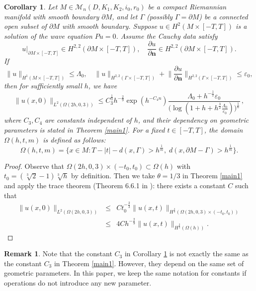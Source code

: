 \documentclass[11pt,letterpaper]{amsart}
\numberwithin{equation}{section}
\theoremstyle{definition}
\theoremstyle{plain}
\theoremstyle{definition}
\theoremstyle{plain}
\newtheorem{initial}[main1]{Corollary}
\theoremstyle{definition}
\newtheorem{remark}[remark0]{Remark}
\theoremstyle{plain}
\begin{document}
\begin{initial}\label{initial}
Let $M\in \mathcal{M}_n(D,K_1,K_2,i_0,r_0)$ be a compact Riemannian manifold with smooth boundary $\partial M$, and let $\Gamma$ (possibly $\Gamma=\partial M$) be a connected open subset of $\partial M$ with smooth boundary. Suppose $u\in H^2(M\times[-T,T])$ is a solution of the wave equation $Pu=0$. Assume the Cauchy data satisfy
$$u|_{\partial M\times [-T,T]}\in H^{2,2}(\partial M \times [-T,T]),\quad \frac{\partial u}{\partial \mathbf{n}} \in H^{2,2}(\partial M \times [-T,T]).$$
If
$$\|u\|_{H^1(M\times[-T,T])}\leqslant \Lambda_0,\quad \|u\|_{H^{2,2}(\Gamma\times [-T,T])}+\big\|\frac{\partial u}{\partial \mathbf{n}}\big\|_{H^{2,2}(\Gamma\times [-T,T])}\leqslant \varepsilon_0,$$
then for sufficiently small $h$, we have
$$\|u(x,0)\|_{L^2(\Omega(2h,0,3))} \leqslant C_3^{\frac{1}{3}}h^{-\frac{2}{9}}\exp(h^{-C_4 n}) \frac{\Lambda_0+h^{-\frac{1}{2}}\varepsilon_0}{\big(\log (1+h+h^{\frac{3}{2}}\frac{\Lambda_0}{\varepsilon_0})\big) ^{\frac{1}{6}}}\, ,$$
where $C_3,C_4$ are constants independent of $h$, and their dependency on geometric parameters is stated in Theorem \ref{main1}. For a fixed $t\in [-T,T]$, the domain $\Omega(h,t,m)$ is defined as follows:
\begin{equation}\label{Omegahtm}
\Omega(h,t,m)=\big\{x\in M: T-|t|-d(x,\Gamma) >h^{\frac{1}{m}},\; d(x,\partial M-\Gamma)>h^{\frac{1}{m}}\big\}.
\end{equation}
\end{initial}
\begin{proof}
Observe that $\Omega(2h,0,3)\times (-t_0,t_0)\subset \Omega(h)$ with $t_0=(\sqrt[3]{2}-1)\sqrt[3]{h}$ by definition. Then we take $\theta=1/3$ in Theorem \ref{main1} and apply the trace theorem (Theorem 6.6.1 in \cite{BL}): there exists a constant $C$ such that
\begin{eqnarray*}
\|u(x,0)\|_{L^2(\Omega(2h,0,3))} &\leqslant& C t_0^{-\frac{2}{3}}\|u(x,t)\|_{H^{\frac{2}{3}}(\Omega(2h,0,3)\times(-t_0,t_0))} \\
&\leqslant& 4C h^{-\frac{2}{9}}\|u(x,t)\|_{H^{\frac{2}{3}}(\Omega(h))}.
\end{eqnarray*}
\vspace{-4.5mm}
\end{proof}

\begin{remark}
Note that the constant $C_3$ in Corollary \ref{initial} is not exactly the same as the constant $C_3$ in Theorem \ref{main1}. However, they depend on the same set of geometric parameters. In this paper, we keep the same notation for constants if operations do not introduce any new parameter.
\end{remark}
\end{document}

